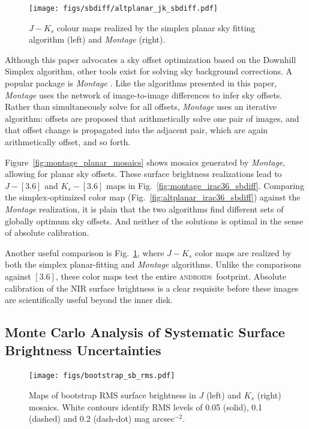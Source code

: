 \documentclass[iop]{emulateapj}
\newcommand{\sw}[1]{\textit{#1}} %
\newcommand{\androids}{\textsc{androids}}
\newcommand{\Fig}[1]{Fig.~\ref{fig:#1}}  %
\begin{document}
\begin{figure}[t]
    \centering
        \texttt{[image: figs/sbdiff/altplanar\_jk\_sbdiff.pdf]}
    \caption{$J-K_s$ colour maps realized by the simplex planar sky fitting algorithm (left) and \sw{Montage} (right).}
    \label{fig:altplanar_jk_sbdiff}
\end{figure}


Although this paper advocates a sky offset optimization based on the \cite{Nelder:1965} Downhill Simplex algorithm, other tools exist for solving sky background corrections.
A popular package is \sw{Montage} \citep{Berriman:2008}.
Like the algorithms presented in this paper, \sw{Montage} uses the network of image-to-image differences to infer sky offsets.
Rather than simultaneously solve for all offsets, \sw{Montage} uses an iterative algorithm: offsets are proposed that arithmetically solve one pair of images, and that offset change is propagated into the adjacent pair, which are again arithmetically offset, and so forth.

Figure~\ref{fig:montage_planar_mosaics} shows mosaics generated by \sw{Montage}, allowing for planar sky offsets.
These surface brightness realizations lead to $J-[3.6]$ and $K_s-[3.6]$ maps in \Fig{montage_irac36_sbdiff}.
Comparing the simplex-optimized color map (\Fig{altplanar_irac36_sbdiff}) against the \sw{Montage} realization, it is plain that the two algorithms find different sets of globally optimum sky offsets.
And neither of the solutions is optimal in the sense of absolute calibration.

Another useful comparison is \Fig{altplanar_jk_sbdiff}, where $J-K_s$ color maps are realized by both the simplex planar-fitting and \sw{Montage} algorithms.
Unlike the comparisons against $[3.6]$, these color maps test the entire \androids\ footprint.
Absolute calibration of the NIR surface brightness is a clear requisite before these images are scientifically useful beyond the inner disk.

\subsection{Monte Carlo Analysis of Systematic Surface Brightness Uncertainties}

\begin{figure}[t]
\centering
\texttt{[image: figs/bootstrap\_sb\_rms.pdf]}
\caption{Maps of bootstrap RMS surface brightness in $J$ (left) and $K_s$ (right) mosaics.
White contours identify RMS levels of 0.05 (solid), 0.1 (dashed) and 0.2 (dash-dot) mag arcsec$^{-2}$.}
\label{fig:bootstrap_sb_rms}
\end{figure}
\end{document}
